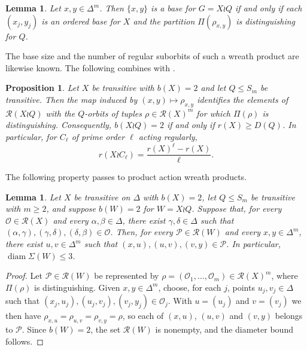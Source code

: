 \documentclass[a4paper,reqno,11pt]{amsart}
\newcommand\diam{\operatorname{diam}}
\newtheorem{prop}[thm]{Proposition}
\newtheorem{lem}[thm]{Lemma}
\numberwithin{equation}{section}
\begin{document}
\begin{lem}\label{basecrit}
Let $x,y\in\Delta^m$. Then $\{x,y\}$ is a base for $G=X\wr Q$ if and only if each $(x_j,y_j)$ is an ordered base for $X$ and the partition $\Pi(\rho_{x,y})$ is distinguishing for $Q$.
\end{lem}

The base size and the number of regular suborbits of such a wreath product are likewise known. The following combines \cite[Corollary~2.9]{BG} with \cite[Theorem~4.4, Remark~4.5 and Corollary~4.7]{BH}.

\begin{prop}\label{bookkeeping}
Let $X$ be transitive with $b(X)=2$ and let $Q\le S_m$ be transitive. Then the map induced by $(x,y)\mapsto\rho_{x,y}$ identifies the elements of $\mathcal R(X\wr Q)$ with the $Q$-orbits of tuples $\rho\in\mathcal R(X)^m$ for which $\Pi(\rho)$ is distinguishing. Consequently, $b(X\wr Q)=2$ if and only if $r(X)\ge D(Q)$. In particular, for $C_\ell$ of prime order $\ell$ acting regularly,
\begin{equation}\label{eq:cyc}
r(X\wr C_\ell)=\frac{r(X)^\ell-r(X)}{\ell}.
\end{equation}
\end{prop}

The following property passes to product action wreath products.

\begin{lem}\label{inherit}
Let $X$ be transitive on $\Delta$ with $b(X)=2$, let $Q\le S_m$ be transitive with $m\ge2$, and suppose $b(W)=2$ for $W=X\wr Q$. Suppose that, for every $\mathcal O\in\mathcal R(X)$ and every $\alpha,\beta\in\Delta$, there exist $\gamma,\delta\in\Delta$ such that $(\alpha,\gamma),(\gamma,\delta),(\delta,\beta)\in\mathcal O$. Then, for every $\mathcal P\in\mathcal R(W)$ and every $x,y\in\Delta^m$, there exist $u,v\in\Delta^m$ such that $(x,u),(u,v),(v,y)\in\mathcal P$. In particular, $\diam\Sigma(W)\le 3$.
\end{lem}

\begin{proof}
Let $\mathcal P\in\mathcal R(W)$ be represented by $\rho=(\mathcal O_1,\dots,\mathcal O_m)\in\mathcal R(X)^m$, where $\Pi(\rho)$ is distinguishing. Given $x,y\in\Delta^m$, choose, for each $j$, points $u_j,v_j\in\Delta$ such that $(x_j,u_j),(u_j,v_j),(v_j,y_j)\in\mathcal O_j$. With $u=(u_j)$ and $v=(v_j)$ we then have $\rho_{x,u}=\rho_{u,v}=\rho_{v,y}=\rho$, so each of $(x,u)$, $(u,v)$ and $(v,y)$ belongs to $\mathcal P$. Since $b(W)=2$, the set $\mathcal R(W)$ is nonempty, and the diameter bound follows.
\end{proof}
\end{document}
